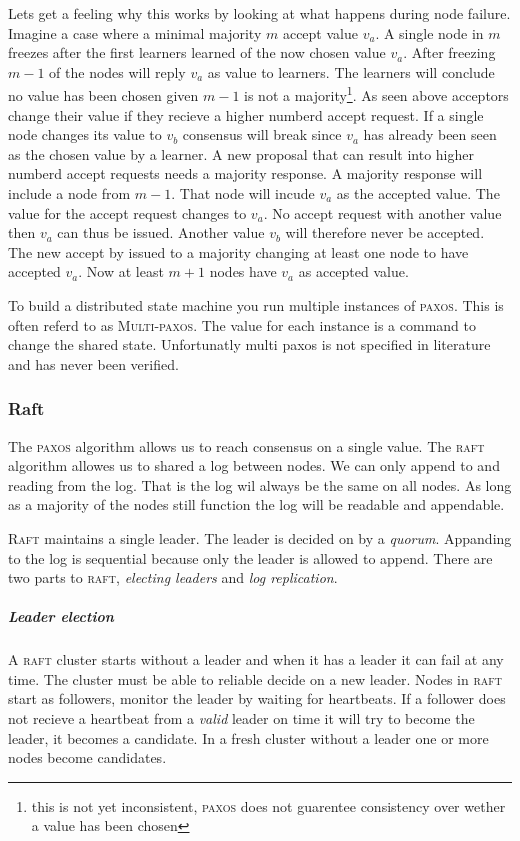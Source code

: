 Lets get a feeling why this works by looking at what happens during node failure. Imagine a case where a minimal majority $m$ accept value $v_a$. A single node in $m$ freezes after the first learners learned of the now chosen value $v_a$. After freezing $m-1$ of the nodes will reply $v_a$ as value to learners. The learners will conclude no value has been chosen given $m-1$ is not a majority\footnote{this is not yet inconsistent, \textsc{paxos} does not guarentee consistency over wether a value has been chosen}. As seen above acceptors change their value if they recieve a higher numberd accept request. If a single node changes its value to $v_b$ consensus will break since $v_a$ has already been seen as the chosen value by a learner. A new proposal that can result into higher numberd accept requests needs a majority response. A majority response will include a node from $m-1$. That node will incude $v_a$ as the accepted value. The value for the accept request changes to $v_a$. No accept request with another value then $v_a$ can thus be issued. Another value $v_b$ will therefore never be accepted. The new accept by issued to a majority changing at least one node to have accepted $v_a$. Now at least $m+1$ nodes have $v_a$ as accepted value.

To build a distributed state machine you run multiple instances of \textsc{paxos}. This is often referd to as \textsc{Multi-paxos}. The value for each instance is a command to change the shared state. Unfortunatly multi paxos is not specified in literature and has never been verified.

\subsubsection*{Raft}
The \textsc{paxos} algorithm allows us to reach consensus on a single value. The \textsc{raft} algorithm allowes us to shared a log between nodes. We can only append to and reading from the log. That is the log wil always be the same on all nodes. As long as a majority of the nodes still function the log will be readable and appendable.

\textsc{Raft} maintains a single leader. The leader is decided on by a \textit{quorum}. Appanding to the log is sequential because only the leader is allowed to append. There are two parts to \textsc{raft}, \textit{electing leaders} and \textit{log replication}.

\subparagraph{Leader election} \label{sec:valid}
A \textsc{raft}\cite{raft} cluster starts without a leader and when it has a leader it can fail at any time. The cluster must be able to reliable decide on a new leader. Nodes in \textsc{raft} start as followers, monitor the leader by waiting for heartbeats. If a follower does not recieve a heartbeat from a \emph{valid} leader on time it will try to become the leader, it becomes a candidate. In a fresh cluster without a leader one or more nodes become candidates.

